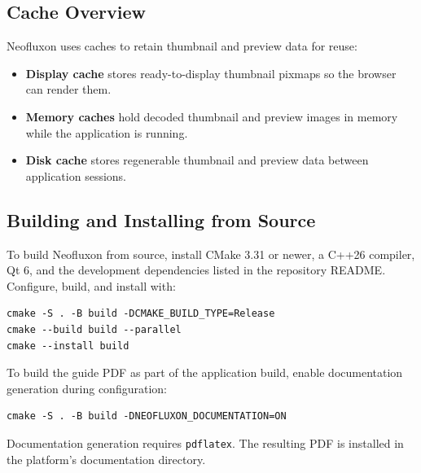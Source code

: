 \documentclass[11pt]{article}
\begin{document}
\subsection{Cache Overview}

Neofluxon uses caches to retain thumbnail and preview data for reuse:
\begin{itemize}
  \item \textbf{Display cache} stores ready-to-display thumbnail pixmaps so
        the browser can render them.
  \item \textbf{Memory caches} hold decoded thumbnail and preview images in
        memory while the application is running.
  \item \textbf{Disk cache} stores regenerable thumbnail and preview data
        between application sessions.
\end{itemize}

\subsection{Building and Installing from Source}

To build Neofluxon from source, install CMake 3.31 or newer, a C++26
compiler, Qt 6, and the development dependencies listed in the repository
README. Configure, build, and install with:
\begin{verbatim}
cmake -S . -B build -DCMAKE_BUILD_TYPE=Release
cmake --build build --parallel
cmake --install build
\end{verbatim}

To build the guide PDF as part of the application build, enable documentation
generation during configuration:
\begin{verbatim}
cmake -S . -B build -DNEOFLUXON_DOCUMENTATION=ON
\end{verbatim}

Documentation generation requires \texttt{pdflatex}. The resulting PDF is
installed in the platform's documentation directory.
\end{document}
